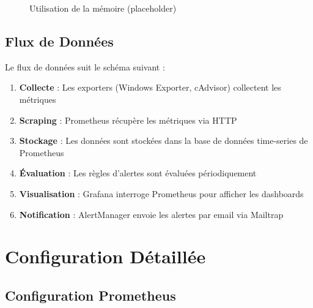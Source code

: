 \documentclass[12pt,a4paper]{report}
\begin{document}
\begin{figure}[H]
\centering
{}
\caption{Utilisation de la mémoire (placeholder)}
\label{fig:memory-usage}
\end{figure}

\section{Flux de Données}

Le flux de données suit le schéma suivant :

\begin{enumerate}
    \item \textbf{Collecte} : Les exporters (Windows Exporter, cAdvisor) collectent les métriques
    \item \textbf{Scraping} : Prometheus récupère les métriques via HTTP
    \item \textbf{Stockage} : Les données sont stockées dans la base de données time-series de Prometheus
    \item \textbf{Évaluation} : Les règles d'alertes sont évaluées périodiquement
    \item \textbf{Visualisation} : Grafana interroge Prometheus pour afficher les dashboards
    \item \textbf{Notification} : AlertManager envoie les alertes par email via Mailtrap
\end{enumerate}

\chapter{Configuration Détaillée}

\section{Configuration Prometheus}
\end{document}
